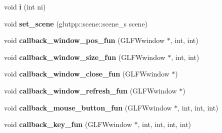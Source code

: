 \begin{DoxyCompactItemize}
\item 
\hypertarget{classglutpp_1_1window_1_1window_ac5181f0d6fab17cfe97ee41faad088a0}{void {\bfseries i} (int ni)}\label{classglutpp_1_1window_1_1window_ac5181f0d6fab17cfe97ee41faad088a0}

\item 
\hypertarget{classglutpp_1_1window_1_1window_a05b0082d83526948c66740934367c396}{void {\bfseries set\-\_\-scene} (glutpp\-::scene\-::scene\-\_\-s scene)}\label{classglutpp_1_1window_1_1window_a05b0082d83526948c66740934367c396}

\item 
\hypertarget{classglutpp_1_1window_1_1window_ae1d72bbacdcddcd15e41588ff7007e4f}{void {\bfseries callback\-\_\-window\-\_\-pos\-\_\-fun} (\-G\-L\-F\-Wwindow $\ast$, int, int)}\label{classglutpp_1_1window_1_1window_ae1d72bbacdcddcd15e41588ff7007e4f}

\item 
\hypertarget{classglutpp_1_1window_1_1window_a4e46f9e890fd37fd4cc8581db48deb42}{void {\bfseries callback\-\_\-window\-\_\-size\-\_\-fun} (\-G\-L\-F\-Wwindow $\ast$, int, int)}\label{classglutpp_1_1window_1_1window_a4e46f9e890fd37fd4cc8581db48deb42}

\item 
\hypertarget{classglutpp_1_1window_1_1window_a5de927572afed2cb2a7424863d2af4be}{void {\bfseries callback\-\_\-window\-\_\-close\-\_\-fun} (\-G\-L\-F\-Wwindow $\ast$)}\label{classglutpp_1_1window_1_1window_a5de927572afed2cb2a7424863d2af4be}

\item 
\hypertarget{classglutpp_1_1window_1_1window_a079777619dab317cae89917b800c76cb}{void {\bfseries callback\-\_\-window\-\_\-refresh\-\_\-fun} (\-G\-L\-F\-Wwindow $\ast$)}\label{classglutpp_1_1window_1_1window_a079777619dab317cae89917b800c76cb}

\item 
\hypertarget{classglutpp_1_1window_1_1window_a3058505d4878bf1a5ceed906c313c359}{void {\bfseries callback\-\_\-mouse\-\_\-button\-\_\-fun} (\-G\-L\-F\-Wwindow $\ast$, int, int, int)}\label{classglutpp_1_1window_1_1window_a3058505d4878bf1a5ceed906c313c359}

\item 
\hypertarget{classglutpp_1_1window_1_1window_a25eba608bb59811962adeb71510503ff}{void {\bfseries callback\-\_\-key\-\_\-fun} (\-G\-L\-F\-Wwindow $\ast$, int, int, int, int)}\label{classglutpp_1_1window_1_1window_a25eba608bb59811962adeb71510503ff}

\end{DoxyCompactItemize}
